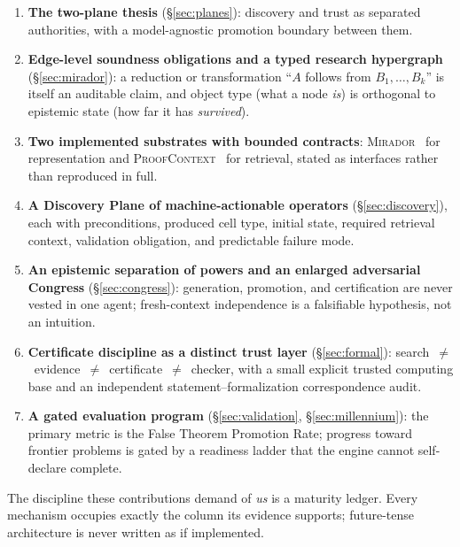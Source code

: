 \documentclass[11pt]{amsart}
\theoremstyle{definition}
\theoremstyle{remark}
\newcommand{\mirador}{\textsc{Mirador}}
\newcommand{\pc}{\textsc{ProofContext}}
\begin{document}
\begin{enumerate}
\item[\textbf{(A)}] \textbf{The two-plane thesis} (\S\ref{sec:planes}):
discovery and trust as separated authorities, with a model-agnostic promotion
boundary between them.
\item[\textbf{(B)}] \textbf{Edge-level soundness obligations and a typed research
hypergraph} (\S\ref{sec:mirador}): a reduction or transformation
``$A$ follows from $B_1,\dots,B_k$'' is itself an auditable claim, and object
type (what a node \emph{is}) is orthogonal to epistemic state (how far it has
\emph{survived}).
\item[\textbf{(C)}] \textbf{Two implemented substrates with bounded contracts}:
\mirador{}~\cite{lucius2026mirador} for representation and
\pc{}~\cite{lucius2026proofcontext} for retrieval, stated as interfaces rather than
reproduced in full.
\item[\textbf{(D)}] \textbf{A Discovery Plane of machine-actionable operators}
(\S\ref{sec:discovery}), each with preconditions, produced cell type, initial
state, required retrieval context, validation obligation, and predictable
failure mode.
\item[\textbf{(E)}] \textbf{An epistemic separation of powers and an enlarged
adversarial Congress} (\S\ref{sec:congress}): generation, promotion, and
certification are never vested in one agent; fresh-context independence is a
falsifiable hypothesis, not an intuition.
\item[\textbf{(F)}] \textbf{Certificate discipline as a distinct trust layer}
(\S\ref{sec:formal}): search~$\neq$~evidence~$\neq$~certificate~$\neq$~checker,
with a small explicit trusted computing base and an independent
statement--formalization correspondence audit.
\item[\textbf{(G)}] \textbf{A gated evaluation program} (\S\ref{sec:validation},
\S\ref{sec:millennium}): the primary metric is the False Theorem Promotion Rate;
progress toward frontier problems is gated by a readiness ladder that the engine
cannot self-declare complete.
\end{enumerate}

\noindent The discipline these contributions demand of \emph{us} is a maturity
ledger. Every mechanism occupies exactly the column its evidence supports;
future-tense architecture is never written as if implemented.
\end{document}
